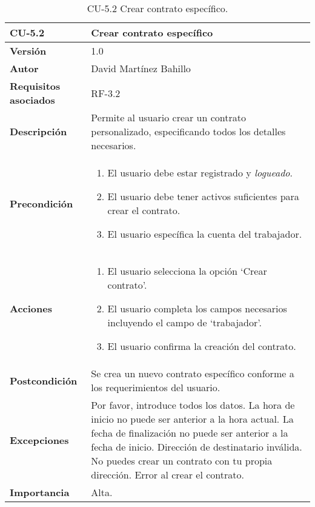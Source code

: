 \begin{table}[p]
	\centering
	\begin{tabularx}{\linewidth}{ p{} p{} }
		\toprule
		\textbf{CU-5.2}  & \textbf{Crear contrato específico}\\
		\midrule
		\textbf{Versión}              & 1.0    \\
		\textbf{Autor}                & David Martínez Bahillo \\
		\textbf{Requisitos asociados} & RF-3.2 \\
		\textbf{Descripción}          & Permite al usuario crear un contrato personalizado, especificando todos los detalles necesarios. \\
		\textbf{Precondición}         &  
		\begin{enumerate}
			\def\labelenumi{\arabic{enumi}.}
			\tightlist
			\item El usuario debe estar registrado y \textit{logueado}.
			\item El usuario debe tener activos suficientes para crear el contrato.
			\item El usuario específica la cuenta del trabajador.
		\end{enumerate}\\
		\textbf{Acciones}             &
		\begin{enumerate}
			\def\labelenumi{\arabic{enumi}.}
			\tightlist
			\item El usuario selecciona la opción `Crear contrato'.
			\item El usuario completa los campos necesarios incluyendo el campo de `trabajador'.
			\item El usuario confirma la creación del contrato.
		\end{enumerate}\\
		\textbf{Postcondición}        & Se crea un nuevo contrato específico conforme a los requerimientos del
		 usuario. \\
		\textbf{Excepciones}          & Por favor, introduce todos los datos. La hora de inicio no puede ser
		 anterior a la hora actual. La fecha de finalización no puede ser anterior a la fecha de inicio.
		 Dirección de destinatario inválida. No puedes crear un contrato con tu propia dirección. Error al
		 crear el contrato.  \\
		\textbf{Importancia}          & Alta.  \\
		\bottomrule
	\end{tabularx}
	\caption{CU-5.2 Crear contrato específico.}
\end{table}


